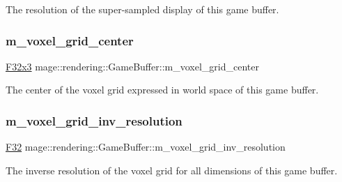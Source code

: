 The resolution of the super-\/sampled display of this game buffer. \hypertarget{structmage_1_1rendering_1_1_game_buffer_a4dddeeb0f0bfb8cdb328338657910f3c}{}\label{structmage_1_1rendering_1_1_game_buffer_a4dddeeb0f0bfb8cdb328338657910f3c} 
\subsubsection{\texorpdfstring{m\+\_\+voxel\+\_\+grid\+\_\+center}{m\_voxel\_grid\_center}}
{\footnotesize\ttfamily \hyperlink{namespacemage_a73fbe0da4b8d5bc156bb8453e5b63a17}{F32x3} mage\+::rendering\+::\+Game\+Buffer\+::m\+\_\+voxel\+\_\+grid\+\_\+center}

The center of the voxel grid expressed in world space of this game buffer. \hypertarget{structmage_1_1rendering_1_1_game_buffer_a613f32740ac3e7f6b1e32f9976447b22}{}\label{structmage_1_1rendering_1_1_game_buffer_a613f32740ac3e7f6b1e32f9976447b22} 
\subsubsection{\texorpdfstring{m\+\_\+voxel\+\_\+grid\+\_\+inv\+\_\+resolution}{m\_voxel\_grid\_inv\_resolution}}
{\footnotesize\ttfamily \hyperlink{namespacemage_aa97e833b45f06d60a0a9c4fc22ae02c0}{F32} mage\+::rendering\+::\+Game\+Buffer\+::m\+\_\+voxel\+\_\+grid\+\_\+inv\+\_\+resolution}

The inverse resolution of the voxel grid for all dimensions of this game buffer. \hypertarget{structmage_1_1rendering_1_1_game_buffer_a705874f8b8be19a790faf47639e750a5}{}\label{structmage_1_1rendering_1_1_game_buffer_a705874f8b8be19a790faf47639e750a5} 
